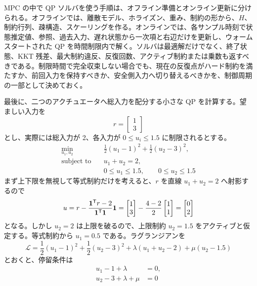 MPC の中で QP ソルバを使う手順は、オフライン準備とオンライン更新に分けられる。オフラインでは、離散モデル、ホライズン、重み、制約の形から、$H$、制約行列、疎構造、スケーリングを作る。オンラインでは、各サンプル時刻で状態推定値、参照、過去入力、遅れ状態から一次項と右辺だけを更新し、ウォームスタートされた QP を時間制限内で解く。ソルバは最適解だけでなく、終了状態、KKT 残差、最大制約違反、反復回数、アクティブ制約または乗数も返すべきである。制限時間で完全収束しない場合でも、現在の反復点がハード制約を満たすか、前回入力を保持すべきか、安全側入力へ切り替えるべきかを、制御周期の一部として決めておく。

最後に、二つのアクチュエータへ総入力を配分する小さな QP を計算する。望ましい入力を
\begin{equation}
  r=
  \begin{bmatrix}
    1\\3
  \end{bmatrix}
\end{equation}
とし、実際には総入力が 2、各入力が $0\le u_i\le1.5$ に制限されるとする。
\begin{align}
  \min_{u_1,u_2}\quad &
  \frac{1}{2}(u_1-1)^2+\frac{1}{2}(u_2-3)^2,\\
  \text{subject to}\quad &
  u_1+u_2=2,\\
  &0\le u_1\le1.5,\qquad 0\le u_2\le1.5
\end{align}
まず上下限を無視して等式制約だけを考えると、$r$ を直線 $u_1+u_2=2$ へ射影するので
\begin{equation}
  u=r-\frac{\mathbf{1}^{\mathsf{T}} r-2}{\mathbf{1}^{\mathsf{T}}\mathbf{1}}\mathbf{1}
  =
  \begin{bmatrix}
    1\\3
  \end{bmatrix}
  -\frac{4-2}{2}
  \begin{bmatrix}
    1\\1
  \end{bmatrix}
  =
  \begin{bmatrix}
    0\\2
  \end{bmatrix}
\end{equation}
となる。しかし $u_2=2$ は上限を破るので、上限制約 $u_2=1.5$ をアクティブと仮定する。等式制約から $u_1=0.5$ である。ラグランジアンを
\begin{equation}
  \mathcal{L}
  =
  \frac{1}{2}(u_1-1)^2+\frac{1}{2}(u_2-3)^2
  +\lambda(u_1+u_2-2)+\mu(u_2-1.5)
\end{equation}
とおくと、停留条件は
\begin{align}
  u_1-1+\lambda&=0,\\
  u_2-3+\lambda+\mu&=0
\end{align}
